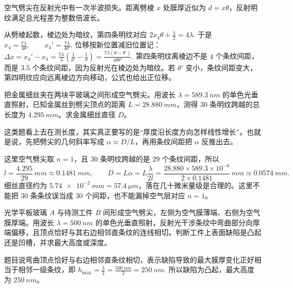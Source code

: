 \begin{solution}
空气劈尖在反射光中有一次半波损失。距离劈棱 \(x\) 处膜厚近似为 \(d=x\theta\)，反射明纹满足总光程差为整数倍波长。

从劈棱起数，棱边处为暗纹，第四条明纹对应
 \(2x_4\theta+\frac{\lambda}{2}=4\lambda.\) 
于是
 \(x_4=\frac{7\lambda}{4\theta},\qquad x_4'=\frac{7\lambda}{4\theta'}.\) 
位移按新位置减旧位置记：
 \(\Delta x=x_4'-x_4 =\frac{7\lambda}{4}\left(\frac{1}{\theta'}-\frac{1}{\theta}\right) =\frac{7\lambda(\theta-\theta')}{4\theta\theta'}.\) 
第四条明纹离棱边不是 \(4\) 个条纹间距，而是 \(3.5\) 个条纹间距，因为反射光在棱边处为暗纹。若 \(\theta'\) 变小，条纹间距变大，第四明纹应向远离棱边方向移动，公式也给出正位移。
\end{solution}

\begin{exercise}[用劈尖条纹间距测金属细丝直径时为什么先写几何斜率]
把金属细丝夹在两块平玻璃之间形成空气劈尖。用波长 \(\lambda=\SI{589.3}{nm}\) 的单色光垂直照射，已知金属丝到劈尖顶点的距离 \(L=\SI{28.880}{mm}\)，测得 \(30\) 条明纹跨越的总长度为 \(\SI{4.295}{mm}\)。求金属细丝直径 \(D\)。
\end{exercise}

\begin{solution}
这类题看上去在测长度，其实真正要写的是“厚度沿长度方向怎样线性增长”。也就是说，先把劈尖的几何斜率写成 \(\alpha\approx D/L\)，再用条纹间距把 \(\alpha\) 反推出去。

这里空气劈尖取 \(n=1\)，且 \(30\) 条明纹跨越的是 \(29\) 个条纹间距，所以
\[
l=\frac{4.295}{29}\,\si{mm}\approx \SI{0.1481}{mm},\qquad
D=L\alpha=L\frac{\lambda}{2l}
=\frac{28.880\times 589.3\times10^{-6}}{2\times0.1481}\,\si{mm}
\approx \SI{0.0574}{mm}.
\]
细丝直径约为 \(\SI{5.74e-2}{mm}=\SI{57.4}{\micro m}\)，落在几十微米量级是合理的。这里不能把 \(30\) 条条纹误当成 \(30\) 个间距，也不能漏掉空气层对应 \(n=1\)。
\end{solution}

\begin{exercise}[空气劈尖条纹弯向厚端时怎样判断凸凹缺陷]
光学平板玻璃 \(A\) 与待测工件 \(B\) 间形成空气劈尖，左侧为空气膜薄端、右侧为空气膜厚端。用波长 \(\lambda=\SI{500}{nm}\) 的单色光垂直照射，反射光干涉条纹中弯曲部分向厚端偏移，且顶点恰好与其右边相邻直条纹的连线相切。判断工件上表面缺陷是凸起还是凹槽，并求最大高度或深度。
\end{exercise}

\begin{solution}
题目说弯曲顶点恰好与右边相邻直条纹相切，表示缺陷导致的最大膜厚变化正好相当于相邻一级条纹，即
 \(h_{\max}=\frac{\lambda}{2} =\frac{\SI{500}{nm}}{2} =\SI{250}{nm}.\) 
所以缺陷为凸起，最大高度为 \(\SI{250}{nm}\)。
\end{solution}
